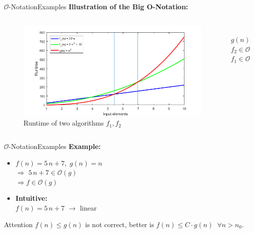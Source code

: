 \begin{frame}{$\mathcal{O}$-Notation}{Examples}
  \textbf{Illustration of the Big O-Notation:}\\[-1.0em]
  \begin{columns}
    \begin{column}{0.9\textwidth}
      \begin{figure}[!h]
        \includegraphics[width=\linewidth]{Images/BigONotationRuntime.png}
        \caption{Runtime of two algorithms $f_1, f_2$}
        \label{fig:big_o_runtime_example}
      \end{figure}
    \end{column}
    \begin{column}{0.1\textwidth}
      \vspace{-4.75em}\\
      \hspace*{-2.5em}$g(n)$\\[2.0em]
      \hspace*{-2.5em}$f_2 \in \mathcal{O}(g)$\\[2.5em]
      \hspace*{-2.5em}$f_1 \in \mathcal{O}(g)$
    \end{column}
  \end{columns}
\end{frame}


\begin{frame}{$\mathcal{O}$-Notation}{Examples}
  \textbf{Example:}
  \begin{itemize}
    \item
      $f(n) = 5 \, n + 7, \; g(n) = n$\\
      $\Rightarrow$ $5 \, n + 7 \in \mathcal{O}(g)$\\
      $\Rightarrow f \in \mathcal{O}(g)$
     \item
      \textbf{Intuitive:}\\
      $f(n) = 5 \, n + 7$ $\rightarrow$ linear
  \end{itemize}
  \begin{alertblock}{Attention}
    $f(n) \leq g(n)$ is not correct, better is
    $f(n) \leq C \cdot g(n) \;\; \forall n > n_0$.
  \end{alertblock}
\end{frame}

